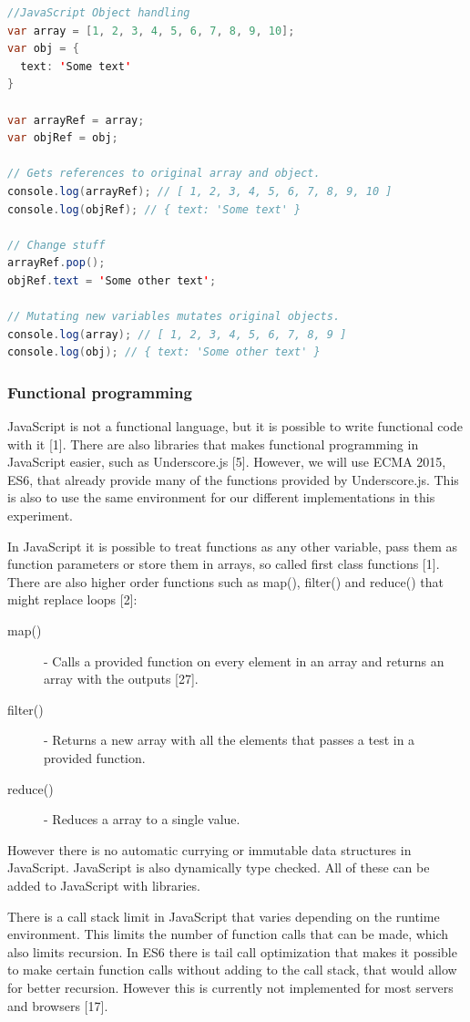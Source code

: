 \documentclass {article}
\begin{document}
\begin{lstlisting}[language=Java, breaklines=true]
//JavaScript Object handling
var array = [1, 2, 3, 4, 5, 6, 7, 8, 9, 10];
var obj = {
  text: 'Some text'
}

var arrayRef = array;
var objRef = obj;

// Gets references to original array and object.
console.log(arrayRef); // [ 1, 2, 3, 4, 5, 6, 7, 8, 9, 10 ]
console.log(objRef); // { text: 'Some text' }

// Change stuff
arrayRef.pop();
objRef.text = 'Some other text';

// Mutating new variables mutates original objects.
console.log(array); // [ 1, 2, 3, 4, 5, 6, 7, 8, 9 ]
console.log(obj); // { text: 'Some other text' }
\end{lstlisting}
\subsubsection{Functional programming}
\label{sec:js-fp}
JavaScript is not a functional language, but it is possible to write functional code with it [1]. There are also libraries that makes functional programming in JavaScript easier, such as Underscore.js [5]. However, we will use ECMA 2015, ES6, that already provide many of the functions provided by Underscore.js. This is also to use the same environment for our different implementations in this experiment.

In JavaScript it is possible to treat functions as any other variable, pass them as function parameters or store them in arrays, so called first class functions [1]. There are also higher order functions such as map(), filter() and reduce() that might replace loops [2]:

\begin{description}
\item [map()] - Calls a provided function on every element in an array and returns an array with the outputs [27].
\item [filter()] - Returns a new array with all the elements that passes a test in a provided function. 
\item [reduce()] - Reduces a array to a single value.
\end{description}

However there is no automatic currying or immutable data structures in JavaScript. JavaScript is also dynamically type checked. All of these can be added to JavaScript with libraries.

There is a call stack limit in JavaScript that varies depending on the runtime environment. This limits the number of function calls that can be made, which also limits recursion. In ES6 there is tail call optimization that makes it possible to make certain function calls without adding to the call stack, that would allow for better recursion. However this is currently not implemented for most servers and browsers [17].
\end{document}
